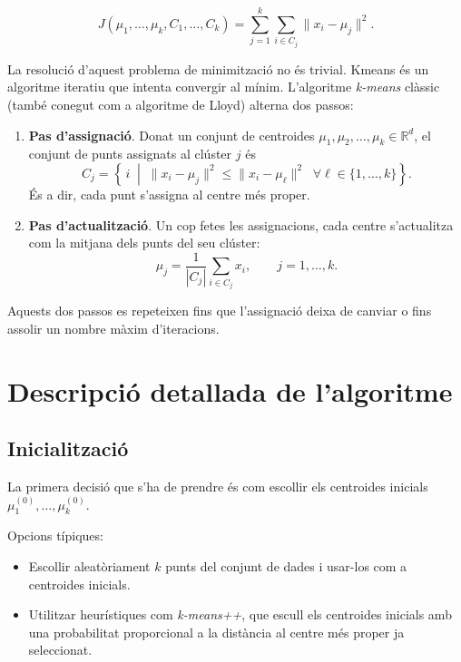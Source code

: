 \documentclass[a4paper,11pt]{article}
\begin{document}
\[
  J(\mu_1,\dots,\mu_k, C_1,\dots,C_k)
  = \sum_{j=1}^{k} \sum_{i \in C_j} \| x_i - \mu_j \|^2.
\]

La resolució d'aquest problema de minimització no és trivial. Kmeans és un
algoritme iteratiu que intenta convergir al mínim. L'algoritme \textit{k-means} 
clàssic (també conegut com a algoritme de Lloyd) alterna dos passos:

\begin{enumerate}
  \item \textbf{Pas d'assignació}.  
  Donat un conjunt de centroides $\mu_1, \mu_2, \dots, \mu_k \in \mathbb{R}^d$, el conjunt de punts assignats al clúster $j$ és
  \[
    C_j = \left\{\, i \;\middle|\; 
      \|x_i - \mu_j\|^2 \leq \|x_i - \mu_\ell\|^2 \;\; \forall \ell \in \{1,\dots,k\}
    \right\}.
  \]
  És a dir, cada punt s’assigna al centre més proper.

  \item \textbf{Pas d’actualització}.  
  Un cop fetes les assignacions, cada centre s’actualitza com la mitjana dels punts del seu clúster:
  \[
    \mu_j = \frac{1}{|C_j|} \sum_{i \in C_j} x_i,
    \qquad j = 1,\dots,k.
  \]
\end{enumerate}

Aquests dos passos es repeteixen fins que l’assignació deixa de canviar
o fins assolir un nombre màxim d'iteracions.

\section{Descripció detallada de l'algoritme}

\subsection{Inicialització}

La primera decisió que s'ha de prendre és com escollir els centroides
inicials $\mu_1^{(0)}, \dots, \mu_k^{(0)}$.

Opcions típiques:
\begin{itemize}
  \item Escollir aleatòriament $k$ punts del conjunt de dades i usar-los
        com a centroides inicials.
  \item Utilitzar heurístiques com \textit{k-means++}, que escull
        els centroides inicials amb una probabilitat proporcional
        a la distància al centre més proper ja seleccionat.
\end{itemize}
\end{document}
